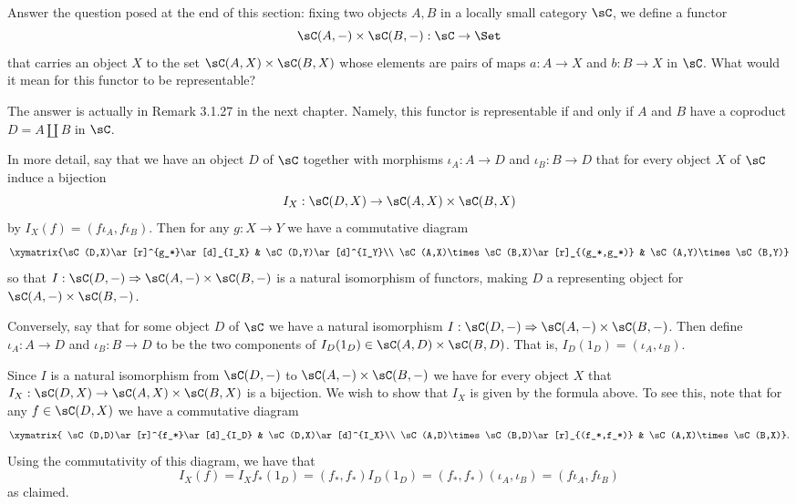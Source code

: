 \documentclass[../../main]{subfiles}
\begin{document}
\paragraph{}
\begin{exercise}
Answer the question posed at the end of this section: fixing two objects $A,B$ in a locally small category $\sC$, we define a functor
\[\sC(A,-)\times\sC(B,-):\sC\rightarrow\Set\]
that carries an object $X$ to the set $\sC(A,X)\times\sC(B,X)$ whose elements are pairs of maps $a:A\rightarrow X$ and $b:B\rightarrow X$ in $\sC$. What would it mean for this functor to be representable?
\end{exercise}

The answer is actually in Remark 3.1.27 in the next chapter. Namely,  this functor is representable if and only if $A$ and $B$ have a coproduct $D=A\coprod B$ in $\sC$.

In more detail, say that we have an object $D$ of $\sC$ together with morphisms $\iota_A:A\rightarrow D$ and $\iota_B:B\rightarrow D$ that for every object $X$ of $\sC$ induce a bijection
\[I_X:\sC(D,X)\rightarrow\sC(A,X)\times\sC(B,X)\]
by $I_X(f)=(f\iota_A,f\iota_B)$. Then for any $g:X\rightarrow Y$ we have a commutative diagram
\[\xymatrix{\sC(D,X)\ar[r]^{g_*}\ar[d]_{I_X} & \sC(D,Y)\ar[d]^{I_Y}\\
\sC(A,X)\times\sC(B,X)\ar[r]_{(g_*,g_*)} & \sC(A,Y)\times\sC(B,Y)}\]
so that $I:\sC(D,-)\Rightarrow\sC(A,-)\times\sC(B,-)$ is a natural isomorphism of functors, making $D$ a representing object for $\sC(A,-)\times\sC(B,-)$.

Conversely, say that for some object $D$ of $\sC$ we have a natural isomorphism $I:\sC(D,-)\Rightarrow\sC(A,-)\times\sC(B,-)$. Then define $\iota_A:A\rightarrow D$ and $\iota_B:B\rightarrow D$ to be the two components of $I_D(1_D)\in\sC(A,D)\times\sC(B,D)$. That is, $I_D(1_D)=(\iota_A,\iota_B)$.

Since $I$ is a natural isomorphism from $\sC(D,-)$ to $\sC(A,-)\times\sC(B,-)$ we have for every object $X$ that $I_X:\sC(D,X)\rightarrow\sC(A,X)\times\sC(B,X)$ is a bijection. We wish to show that $I_X$ is given by the formula above. To see this, note that for any $f\in\sC(D,X)$ we have a commutative diagram
\[\xymatrix{
\sC(D,D)\ar[r]^{f_*}\ar[d]_{I_D} & \sC(D,X)\ar[d]^{I_X}\\
\sC(A,D)\times\sC(B,D)\ar[r]_{(f_*,f_*)} & \sC(A,X)\times\sC(B,X)}.\]
Using the commutativity of this diagram, we have that
\[I_X(f)=I_Xf_*(1_D)=(f_*,f_*)I_D(1_D)=(f_*,f_*)(\iota_A,\iota_B)=(f\iota_A,f\iota_B)\]
as claimed.
\end{document}
